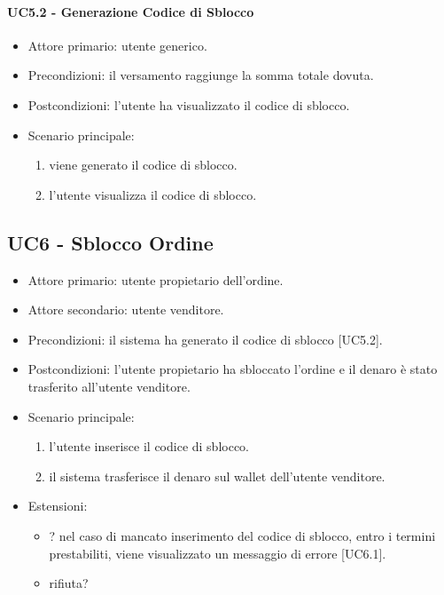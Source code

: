 \paragraph{UC5.2 - Generazione Codice di Sblocco}

\begin{itemize}
    \item Attore primario: utente generico.
    \item Precondizioni: il versamento raggiunge la somma totale dovuta.
    \item Postcondizioni: l'utente ha visualizzato il codice di sblocco.
    \item Scenario principale: \begin{enumerate}
        \item viene generato il codice di sblocco.
        \item l'utente visualizza il codice di sblocco.
    \end{enumerate}
\end{itemize}

\subsection{UC6 - Sblocco Ordine}

\begin{itemize}
    \item Attore primario: utente propietario dell'ordine.
    \item Attore secondario: utente venditore.
    \item Precondizioni: il sistema ha generato il codice di sblocco [UC5.2]. 
    \item Postcondizioni: l'utente propietario ha sbloccato l'ordine e il denaro è stato trasferito all'utente venditore.
    \item Scenario principale: \begin{enumerate}
        \item l'utente inserisce il codice di sblocco.
        \item il sistema trasferisce il denaro sul wallet dell'utente venditore.
    \end{enumerate}
    \item Estensioni: \begin{itemize}
        \item ? nel caso di mancato inserimento del codice di sblocco, entro i termini prestabiliti, viene visualizzato un messaggio di errore [UC6.1].
        \item rifiuta? %
        \end{itemize}
\end{itemize}

